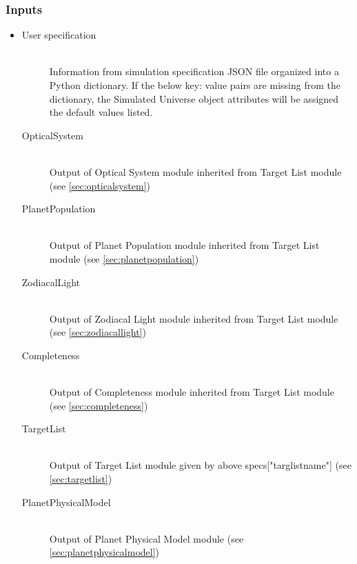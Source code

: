 \documentclass[cleanfoot]{asme2ej}
\begin{document}
\subsubsection*{Inputs}
\begin{itemize}
    \item 
    \begin{description}
        \item[User specification] \hfill \\
        Information from simulation specification JSON file organized into a Python dictionary. If the below key: value pairs are missing from the dictionary, the Simulated Universe object attributes will be assigned the default values listed.
        \item[OpticalSystem] \hfill \\
        Output of Optical System module inherited from Target List module (see \ref{sec:opticalsystem})
        \item[PlanetPopulation] \hfill \\
        Output of Planet Population module inherited from Target List module (see \ref{sec:planetpopulation})
        \item[ZodiacalLight] \hfill \\
        Output of Zodiacal Light module inherited from Target List module (see \ref{sec:zodiacallight})
        \item[Completeness] \hfill \\
        Output of Completeness module inherited from Target List module (see \ref{sec:completeness})
        \item[TargetList] \hfill \\
        Output of Target List module given by above specs["targlistname"] (see \ref{sec:targetlist})
        \item[PlanetPhysicalModel] \hfill \\
        Output of Planet Physical Model module (see \ref{sec:planetphysicalmodel})
    \end{description}
\end{itemize}
\end{document}
